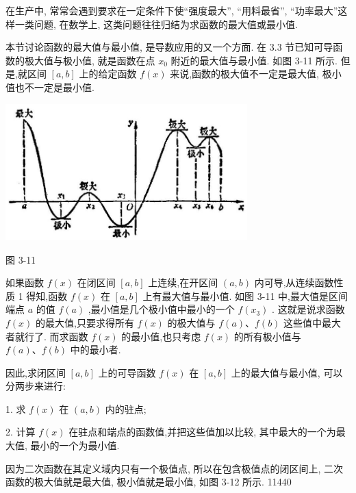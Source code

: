 \documentclass[lang=cn,newtx,10pt,scheme=chinese]{elegantbook}
\begin{document}
在生产中, 常常会遇到要求在一定条件下使“强度最大”, “用料最省”, “功率最大”这样一类问题, 在数学上, 这类问题往往归结为求函数的最大值或最小值.

本节讨论函数的最大值与最小值, 是导数应用的又一个方面. 在 3.3 节已知可导函数的极大值与极小值, 就是函数在点 \({x}_{0}\) 附近的最大值与最小值. 如图 3-11 所示. 但是,就区间 \(\left\lbrack {a,b}\right\rbrack\) 上的给定函数 \(f\left( x\right)\) 来说,函数的极大值不一定是最大值, 极小值也不一定是最小值.

\begin{center}
\includegraphics[max width=0.7\textwidth]{images/01912c18-5c3f-733d-b775-749ba9897a9d_146_522148.jpg}
\end{center}

图 3-11

如果函数 \(f\left( x\right)\) 在闭区间 \(\left\lbrack {a,b}\right\rbrack\) 上连续,在开区间 \(\left( {a,b}\right)\) 内可导,从连续函数性质 1 得知,函数 \(f\left( x\right)\) 在 \(\left\lbrack {a,b}\right\rbrack\) 上有最大值与最小值. 如图 3-11 中,最大值是区间端点 \(a\) 的值 \(f\left( a\right)\) ,最小值是几个极小值中最小的一个 \(f\left( {x}_{3}\right)\) . 这就是说求函数 \(f\left( x\right)\) 的最大值,只要求得所有 \(f\left( x\right)\) 的极大值与 \(f\left( a\right) \text{、}f\left( b\right)\) 这些值中最大者就行了. 而求函数 \(f\left( x\right)\) 的最小值,也只考虑 \(f\left( x\right)\) 的所有极小值与 \(f\left( a\right) \text{、}f\left( b\right)\) 中的最小者.

因此,求闭区间 \(\left\lbrack {a,b}\right\rbrack\) 上的可导函数 \(f\left( x\right)\) 在 \(\left\lbrack {a,b}\right\rbrack\) 上的最大值与最小值, 可以分两步来进行:

1. 求 \(f\left( x\right)\) 在 \(\left( {a,b}\right)\) 内的驻点;

2. 计算 \(f\left( x\right)\) 在驻点和端点的函数值,并把这些值加以比较, 其中最大的一个为最大值, 最小的一个为最小值.

因为二次函数在其定义域内只有一个极值点, 所以在包含极值点的闭区间上, 二次函数的极大值就是最大值, 极小值就是最小值, 如图 3-12 所示. 11440
\end{document}
